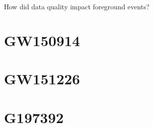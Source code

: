How did data quality impact foreground events?

\section{GW150914}

\section{GW151226}

\section{G197392}



